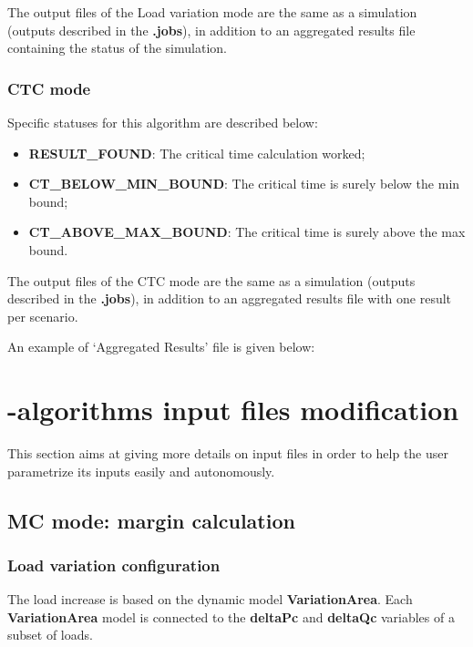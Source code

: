 \documentclass[a4paper, 12pt]{report}
\begin{document}
The output files of the Load variation mode are the same as a \Dynawo simulation (outputs described in the \textbf{.jobs}), in addition to an aggregated 
results file containing the status of the simulation.

\subsubsection{CTC mode}

Specific statuses for this algorithm are described below:
\begin{itemize}
  \item \textbf{RESULT\_FOUND}: The critical time calculation worked;
  \item \textbf{CT\_BELOW\_MIN\_BOUND}: The critical time is surely below the min bound;
  \item \textbf{CT\_ABOVE\_MAX\_BOUND}: The critical time is surely above the max bound.
\end{itemize}

The output files of the CTC mode are the same as a \Dynawo simulation (outputs described in the \textbf{.jobs}), in addition to an aggregated 
results file with one result per scenario.

An example of `Aggregated Results' file is given below:




\section[Dynawo input files modification]{\Dynawo-algorithms input files modification}

This section aims at giving more details on input files in order to help the user parametrize its inputs easily and autonomously.

\subsection{MC mode: margin calculation}
\subsubsection{Load variation configuration}
\label{Dynawo_Algorithms_Inputs_Load_Variation}
The load increase is based on the dynamic model \textbf{VariationArea}. Each \textbf{VariationArea} model is connected to the 
\textbf{deltaPc} and \textbf{deltaQc} variables of a subset of loads. 
\end{document}

